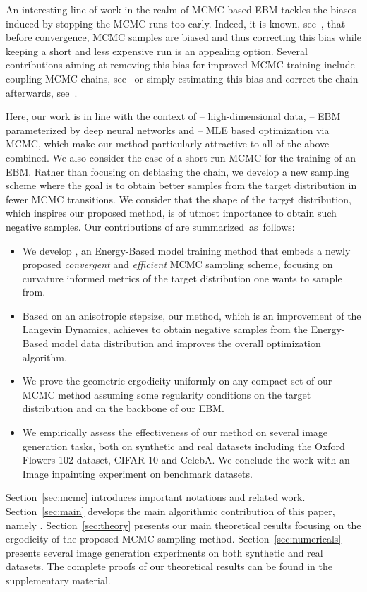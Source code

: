 \documentclass[letterpaper]{article} %
\begin{document}
An interesting line of work in the realm of MCMC-based EBM tackles the biases induced by stopping the MCMC runs too early. 
Indeed, it is known, see~\citet{meyn2012markov}, that before convergence, MCMC samples are biased and thus correcting this bias while keeping a short and less expensive run is an appealing option.
Several contributions aiming at removing this bias for improved MCMC training include coupling MCMC chains, see~\citet{qiu2019unbiased,jacob2020unbiased} or simply estimating this bias and correct the chain afterwards, see~\citet{du2020improved}.

Here, our work is in line with the context of -- high-dimensional data, -- EBM parameterized by deep neural networks and -- MLE based optimization via MCMC, which make our method particularly attractive to all of the above combined. 
We also consider the case of a short-run MCMC for the training of an EBM.
Rather than focusing on debiasing the chain, we develop a new sampling scheme where the goal is to obtain better samples from the target distribution in fewer MCMC transitions.
We consider that the shape of the target distribution, which inspires our proposed method, is of utmost importance to obtain such negative samples.
Our contributions of are summarized~as~follows:
\begin{itemize}
\item We develop \algo, an Energy-Based model training method that embeds a newly proposed \emph{convergent} and \emph{efficient} MCMC sampling scheme, focusing on curvature informed metrics of the target distribution one wants to sample from.
\item Based on an anisotropic stepsize, our method, which is an improvement of the Langevin Dynamics, achieves to obtain negative samples from the Energy-Based model data distribution and improves the overall optimization algorithm.
\item We prove the geometric ergodicity uniformly on any compact set of our MCMC method assuming some regularity conditions on the target distribution and on the backbone of our EBM.
\item We empirically assess the effectiveness of our method on several image generation tasks, both on synthetic and real datasets including the Oxford Flowers 102 dataset, CIFAR-10 and CelebA. We conclude the work with an Image inpainting experiment on benchmark datasets.
\end{itemize}

Section~\ref{sec:mcmc} introduces important notations and related work.
Section~\ref{sec:main} develops the main algorithmic contribution of this paper, namely \algo.
Section~\ref{sec:theory} presents our main theoretical results focusing on the ergodicity of the proposed MCMC sampling method.
Section~\ref{sec:numericals} presents several image generation experiments on both synthetic and real datasets.
The complete proofs of our theoretical results can be found in the supplementary material.
\end{document}
